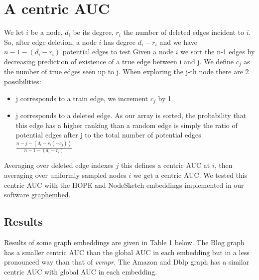 \documentclass{article}
\begin{document}
\section{A centric AUC}

We let $i$ be a node, $d_{i}$ be its degree, $r_{i}$ the number of deleted edges incident to $i$.
So, after edge deletion, a node $i$ has degree $d_{i} - r_{i}$ and we have  $ n - 1 - (d_{i} - r_{i})$  potential edges to test
Given a node $i$ we sort the n-1 edges by decreasing prediction of existence of a true edge between i and j. We define $c_{j}$  as the number of true edges seen up to j.
When exploring the j-th node there are 2 possibilities:
\begin{itemize}
    \item j corresponds to a train edge, we increment $c_{j}$ by 1
    \item j corresponds to a deleted edge. As our array is sorted, the probability that this edge has a higher
          ranking than a random edge is simply the ratio of potential edges after j to
          the total number of potential edges $ \frac{n-j-(d_{i}-r_{i}(-c_{j}))}{n-1-(d_{i}-r_{i})}$
\end{itemize}
Averaging over deleted edge indexes $j$ this defines a centric AUC at  $i$, then averaging over uniformly sampled nodes $i$ we get a centric AUC.
We tested this centric AUC with the HOPE \citep{Ou2016asymmetric} and NodeSketch \citep{Yang2019nodesketch} embeddings implemented
in our software \href{https://github.com/jean-pierreBoth/graphembed}{\color{blue}graphembed}.

\subsection{Results}

Results of some graph embeddings are given in Table 1 below. The Blog graph has a smaller centric AUC than the global AUC in each embedding but in a less pronounced way than that of \textit{vcmpr}. The Amazon and Dblp graph has a similar centric AUC with global AUC in each embedding.
\end{document}

